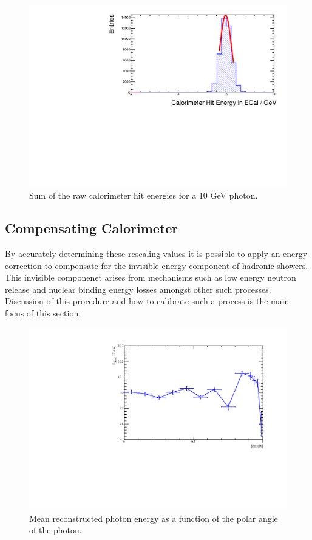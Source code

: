 \begin{figure}
  \includegraphics[width=\largefigwidth]{EnergyEstimators/Plots/Calibration/ECalDigitsation.pdf}
  \caption[Sum of the raw calorimeter hit energies for a 10 GeV photon.]{Sum of the raw calorimeter hit energies for a 10 GeV photon.}
  \label{engest:fig:ecaldigi}
\end{figure}




\subsection{Compensating Calorimeter}

By accurately determining these rescaling values it is possible to apply an energy correction to compensate for the invisible energy component of hadronic showers.  This invisible componenet arises from mechanisms such as low energy neutron release and nuclear binding energy losses amongst other such processes.  Discussion of this procedure and how to calibrate such a process is the main focus of this section.  


\begin{figure}
  \includegraphics[width=\largefigwidth]{EnergyEstimators/Plots/Calibration/Validation/AngularDistributionPhotonPlot.pdf}
  \caption[Mean reconstructed photon energy as a function of the polar angle of the photon.]{Mean reconstructed photon energy as a function of the polar angle of the photon.}
  \label{engest:fig:photonangle}
\end{figure}

